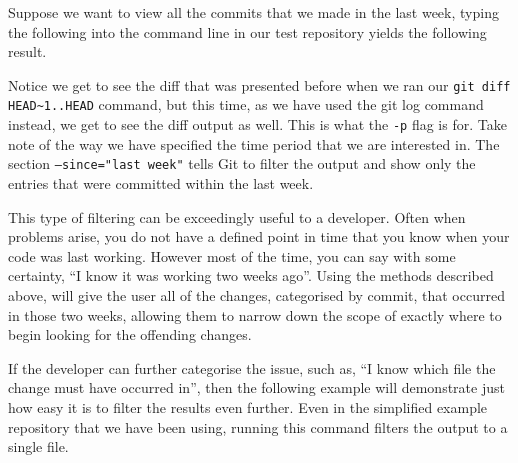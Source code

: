 Suppose we want to view all the commits that we made in the last week, typing the following into the command line in our test repository yields the following result.


Notice we get to see the diff that was presented before when we ran our \texttt{git diff HEAD\textasciitilde1..HEAD} command, but this time, as we have used the git log command instead, we get to see the diff output as well.
This is what the \texttt{-p} flag is for.
Take note of the way we have specified the time period that we are interested in.
The section \texttt{--since="last week"} tells Git to filter the output and show only the entries that were committed within the last week.

This type of filtering can be exceedingly useful to a developer.
Often when problems arise, you do not have a defined point in time that you know when your code was last working.
However most of the time, you can say with some certainty, ``I know it was working two weeks ago''.
Using the methods described above, will give the user all of the changes, categorised by commit, that occurred in those two weeks, allowing them to narrow down the scope of exactly where to begin looking for the offending changes.

If the developer can further categorise the issue, such as, ``I know which file the change must have occurred in'', then the following example will demonstrate just how easy it is to filter the results even further.
Even in the simplified example repository that we have been using, running this command filters the output to a single file.

